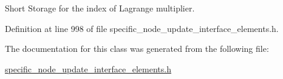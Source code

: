 Short Storage for the index of Lagrange multiplier. 



Definition at line 998 of file specific\+\_\+node\+\_\+update\+\_\+interface\+\_\+elements.\+h.



The documentation for this class was generated from the following file\+:\begin{DoxyCompactItemize}
\item 
\hyperlink{specific__node__update__interface__elements_8h}{specific\+\_\+node\+\_\+update\+\_\+interface\+\_\+elements.\+h}\end{DoxyCompactItemize}
